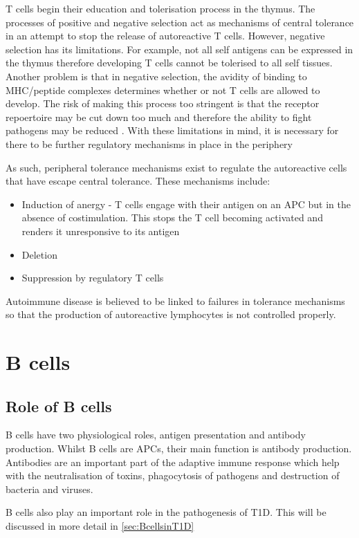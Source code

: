 T cells begin their education and tolerisation process in the thymus.
The processes of positive and negative selection act as mechanisms of central tolerance in an attempt to stop the release of autoreactive T cells\citep{Walker2002}.
However, negative selection has its limitations.
For example, not all self antigens can be expressed in the thymus therefore developing T cells cannot be tolerised to all self tissues.
Another problem is that in negative selection, the avidity of binding to MHC/peptide complexes determines whether or not T cells are allowed to develop.
The risk of making this process too stringent is that the receptor repoertoire may be cut down too much and therefore the ability to fight pathogens may be reduced \citep{Walker2002}.
With these limitations in mind, it is necessary for there to be further regulatory mechanisms in place in the periphery

As such, peripheral tolerance mechanisms exist to regulate the autoreactive cells that have escape central tolerance.
These mechanisms include:
\begin{itemize}
\item Induction of anergy - T cells engage with their antigen on an APC but in the absence of costimulation. This stops the T cell becoming activated and renders it unresponsive to its antigen\citep{Abbas2004}
\item Deletion\citep{Abbas2004}
\item Suppression by regulatory T cells\citep{Abbas2004}
\end{itemize}

Autoimmune disease is believed to be linked to failures in tolerance mechanisms so that the production of autoreactive lymphocytes is not controlled properly.

\section{B cells}
\subsection{Role of B cells}
\label{subsec:Bcellrole}
B cells have two physiological roles, antigen presentation and antibody production.
Whilst B cells are APCs, their main function is antibody production.
Antibodies are an important part of the adaptive immune response which help with the neutralisation of toxins, phagocytosis of pathogens and destruction of bacteria and viruses.

B cells also play an important role in the pathogenesis of T1D. 
This will be discussed in more detail in \cref{sec:BcellsinT1D}

